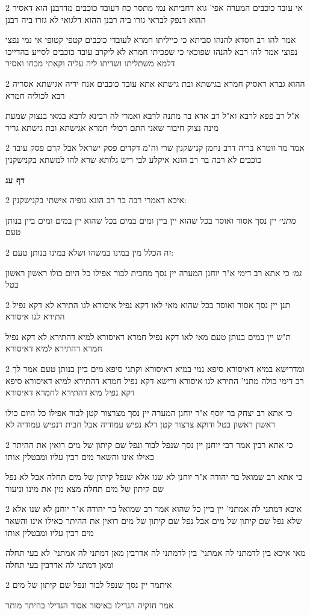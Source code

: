 \documentclass[12pt, openany]{book}
\newcommand{\sethebfont}{
\fontsize{10.5pt}{21.0pt} \selectfont
}
\newcommand{\twocol}[1]{
	{\sethebfont \begin{multicols}{2}
			#1
	\end{multicols}}	
}
\newcommand{\sectname}{}
\newcommand{\newsection}[1]{
	\addcontentsline{toc}{section}{#1}
	\renewcommand{\sectname}{#1}	
	\vspace{-\baselineskip}
	\begin{center}
		\textbf{%
\fontsize{16pt}{16pt}\selectfont
			#1}
	\end{center}
	\vspace{-\baselineskip}
	\nopagebreak
}
\begin{document}
\twocol{אי עובד כוכבים המערה אפי' גוא דחביתא נמי מתסר כח דעובד כוכבים מדרבנן הוא דאסיר ההוא דנפק לבראי גזרו ביה רבנן ההוא דלגואי לא גזרו ביה רבנן
\par אמר להו רב חסדא להנהו סביתא כי כייליתו חמרא לעובדי כוכבים קטפי קטופי אי נמי נפצי נפוצי אמר להו רבא להנהו שפוכאי כי שפכיתו חמרא לא ליקרב עובד כוכבים לסייע בהדייכו דלמא משתליתו ושדיתו ליה עליה וקאתי מכחו ואסיר}
\twocol{ההוא גברא דאסיק חמרא בגישתא ובת גישתא אתא עובד כוכבים אנח ידיה אגישתא אסריה רבא לכוליה חמרא
\par א"ל רב פפא לרבא וא"ל רב אדא בר מתנה לרבא ואמרי לה רבינא לרבא במאי בנצוק שמעת מינה נצוק חיבור שאני התם דכולי חמרא אגישתא ובת גישתא גריר}
\twocol{אמר מר זוטרא בריה דרב נחמן קנישקנין שרי וה"מ דקדים פסק ישראל אבל קדם פסק עובד כוכבים לא רבה בר רב הונא איקלע לבי ריש גלותא שרא להו למשתא בקנישקנין}
\newsection{דף עג}
\twocol{איכא דאמרי רבה בר רב הונא גופיה אישתי בקנישקנין:
\par {\large\emph{מתני׳}} יין נסך אסור ואוסר בכל שהוא יין ביין ומים במים בכל שהוא יין במים ומים ביין בנותן טעם}
\twocol{זה הכלל מין במינו במשהו ושלא במינו בנותן טעם:
\par {\large\emph{גמ׳}} כי אתא רב דימי א"ר יוחנן המערה יין נסך מחבית לבור אפילו כל היום כולו ראשון ראשון בטל}
\twocol{תנן יין נסך אסור ואוסר בכל שהוא מאי לאו דקא נפיל איסורא לגו התירא לא דקא נפיל התירא לגו איסורא
\par ת"ש יין במים בנותן טעם מאי לאו דקא נפיל חמרא דאיסורא למיא דהתירא לא דקא נפיל חמרא דהתירא למיא דאיסורא}
\twocol{ומדרישא במיא דאיסורא סיפא נמי במיא דאיסורא וקתני סיפא מים ביין בנותן טעם אמר לך רב דימי כולה מתני' התירא לגו איסורא ורישא דקא נפיל חמרא דהתירא למיא דאיסורא סיפא דקא נפיל מיא דהתירא לחמרא דאיסורא
\par כי אתא רב יצחק בר יוסף א"ר יוחנן המערה יין נסך מצרצור קטן לבור אפילו כל היום כולו ראשון ראשון בטל ודוקא צרצור קטן דלא נפיש עמודיה אבל חבית דנפיש עמודיה לא}
\twocol{כי אתא רבין אמר רבי יוחנן יין נסך שנפל לבור ונפל שם קיתון של מים רואין את ההיתר כאילו אינו והשאר מים רבין עליו ומבטלין אותו
\par כי אתא רב שמואל בר יהודה א"ר יוחנן לא שנו אלא שנפל קיתון של מים תחלה אבל לא נפל שם קיתון של מים תחלה מצא מין את מינו וניעור}
\twocol{איכא דמתני לה אמתני' יין ביין כל שהוא אמר רב שמואל בר יהודה א"ר יוחנן לא שנו אלא שלא נפל שם קיתון של מים אבל נפל שם קיתון של מים רואין את ההיתר כאילו אינו והשאר מים רבין עליו ומבטלין אותו
\par מאי איכא בין לדמתני לה אמתני' בין לדמתני לה אדרבין מאן דמתני לה אמתני' לא בעי תחלה ומאן דמתני לה אדרבין בעי תחלה}
\twocol{איתמר יין נסך שנפל לבור ונפל שם קיתון של מים
\par אמר חזקיה הגדילו באיסור אסור הגדילו בהיתר מותר}
\end{document}
